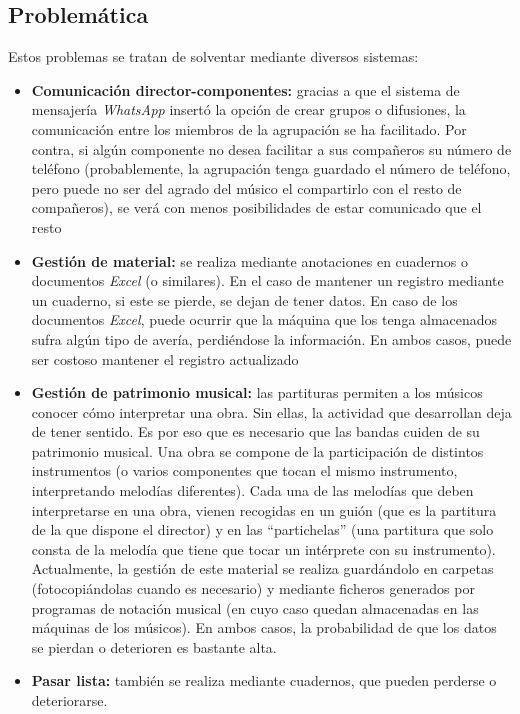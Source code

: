 \documentclass[11pt,spanish]{article}
\begin{document}
\subsection{Problemática}
Estos problemas se tratan de solventar mediante diversos sistemas:
\begin{itemize}
  \item \textbf{Comunicación director-componentes:} gracias a que el sistema de mensajería
  \textit{WhatsApp} insertó la opción de crear grupos o difusiones, la comunicación entre
  los miembros de la agrupación se ha facilitado. Por contra, si algún componente no
  desea facilitar a sus compañeros su número de teléfono (probablemente, la agrupación
  tenga guardado el número de teléfono, pero puede no ser del agrado del músico el compartirlo
  con el resto de compañeros), se  verá con menos posibilidades de estar
  comunicado que el resto
  \item \textbf{Gestión de material:} se realiza mediante anotaciones en cuadernos o documentos \textit{Excel}
  (o similares). En el caso de mantener un registro mediante un cuaderno, si este se pierde, se dejan de tener datos.
  En caso de los documentos \textit{Excel}, puede ocurrir que la máquina que los tenga almacenados sufra algún
  tipo de avería,  perdiéndose la información. En ambos casos,
  puede ser costoso mantener el registro actualizado
  \item \textbf{Gestión de patrimonio musical:} las partituras permiten a los músicos conocer cómo
  interpretar una obra. Sin ellas, la actividad que desarrollan deja de tener sentido.
  Es por eso que es necesario que las bandas cuiden de su patrimonio musical. \newline
  Una obra se compone de la   participación de distintos instrumentos (o varios componentes que tocan
  el mismo instrumento,
  interpretando melodías diferentes). Cada una de las melodías que deben interpretarse en una obra,
  vienen recogidas en un guión (que es la partitura de la que dispone el director) y en las “partichelas”
  (una partitura que solo consta de la melodía que tiene que tocar un intérprete con su instrumento).
  Actualmente, la gestión de este material se realiza guardándolo en carpetas (fotocopiándolas cuando es necesario)
  y mediante ficheros generados por programas de notación musical (en cuyo caso quedan almacenadas en las máquinas de
  los músicos).
  En ambos casos, la probabilidad de que los datos se pierdan o deterioren es bastante alta.
  \item \textbf{Pasar lista:} también se realiza mediante cuadernos, que pueden perderse o deteriorarse.
\end{itemize}
\end{document}
